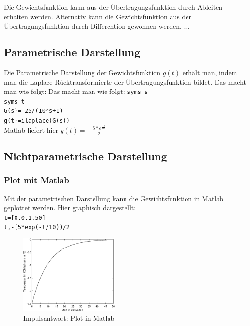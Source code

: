 Die Gewichtsfunktion kann aus der Übertragungsfunktion durch Ableiten erhalten werden.
Alternativ kann die Gewichtsfunktion aus der Übertragungsfunktion durch Differention gewonnen werden.
...
\subsection{Parametrische Darstellung} %
Die Parametrische Darstellung der Gewichtsfunktion $g(t)$ erhält man, indem man die Laplace-Rücktransformierte der Übertragungsfunktion bildet. Das macht man wie folgt: 
Das macht man wie folgt:
\texttt{syms s}\\
\texttt{syms t}\\
\texttt{G(s)=-25/(10*s+1)}\\
\texttt{g(t)=ilaplace(G(s))}\\
Matlab liefert hier $g(t)=-\frac{5*e^{\frac{-t}{10}}}{2}$
\subsection{Nichtparametrische Darstellung}
\subsubsection{Plot mit Matlab}
Mit der parametrischen Darstellung kann die Gewichtsfunktion in Matlab geplottet werden.
Hier graphisch dargestellt:\\
\texttt{t=[0:0.1:50]}\\
\texttt{t,-(5*exp(-t/10))/2}

\begin{figure}[H]
    \centering
    \includegraphics[width=5cm]{image/ImpulsantwortPlotinMatlab.eps}
    \caption{Impulsantwort: Plot in Matlab}
\end{figure}


